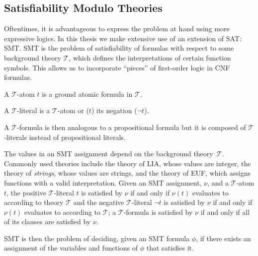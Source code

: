 \subsection{Satisfiability Modulo Theories}

Oftentimes, it is advantageous to express the problem at hand using more expressive logics. In this thesis we make extensive use of an extension of \ac{SAT}: \acf{SMT}. \ac{SMT} is the problem of satisfiability of formulas with respect to some background theory \(\mathcal{T}\), which defines the interpretations of certain function symbols. This allows us to incorporate ``pieces'' of first-order logic in \ac{CNF} formulas.

\begin{definition}
A \(\mathcal{T}\)-atom \(t\) is a ground atomic formula in \(\mathcal{T}\).
\end{definition}


\begin{definition}
A \(\mathcal{T}\)-literal is a \(\mathcal{T}\)-atom  or (\(t\)) its negation (\(\neg t\)).
\end{definition}

\begin{definition}
A \(\mathcal{T}\)-formula is then analogous to a propositional formula but it is composed of \(\mathcal{T}\)-literals instead of propositional literals.
\end{definition}

\noindent
The values in an \ac{SMT} assignment depend on the background theory~\(\mathcal{T}\). Commonly used theories include the theory of \ac{LIA}, whose values are integer, the theory of \textit{strings}, whose values are strings, and the theory of \ac{EUF}, which assigns functions with a valid interpretation. Given an \ac{SMT} assignment, \(\nu\), and a \(\mathcal{T}\)-atom \(t\), the positive \(\mathcal{T}\)-literal \(t\) is satisfied by \(\nu\) if and only if \(\nu(t)\) evaluates to \true according to theory \(\mathcal{T}\) and the negative \(\mathcal{T}\)-literal \(\neg t\) is satisfied by \(\nu\) if and only if \(\nu(t)\) evaluates to \false according to \(\mathcal{T}\); a \(\mathcal{T}\)-formula is satisfied by \(\nu\) if and only if all of its clauses are satisfied by \(\nu\).

\ac{SMT} is then the problem of deciding, given an SMT formula \(\phi\), if there exists an assignment of the variables and functions of \(\phi\) that satisfies it.

